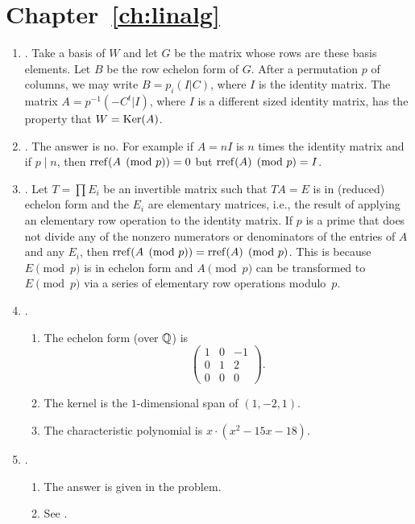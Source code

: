 \section{Chapter~\ref{ch:linalg}}
\begin{enumerate}
\item {}.
Take a basis of $W$ and let $G$ be the matrix
 whose rows are these basis elements. Let
 $B$ be the row echelon form of $G$. 
After a permutation $p$ of columns, we may
 write $B = p_i(I | C)$, where $I$ is the identity matrix.
 The matrix $A = p^{-1}(-C^t | I)$, where $I$ is a different
 sized identity matrix, has the property that
 $W = \operatorname{Ker}(A)$.

\item {}.
The answer is no.  For example if $A=nI$ is $n$ times the
identity matrix and if $p \mid n$, then $\operatorname{rref}(A\pmod{p})=0$
but $\operatorname{rref}(A)\pmod{p}=I$.

\item {}.
Let $T=\prod E_i$ be an invertible matrix such that $TA = E$ is
in (reduced) echelon form and the $E_i$ are elementary matrices,
i.e., the result of applying an elementary row operation to the
identity matrix.  If $p$ is a prime
that does not divide any of the nonzero numerators
or denominators of the entries of $A$ and any $E_i$, then 
$\operatorname{rref}(A \pmod{p}) = \operatorname{rref}(A) \pmod{p}$.  This is
because $E\pmod{p}$ is in echelon form and $A\pmod{p}$
can be transformed to $E\pmod{p}$ via a series of
elementary row operations modulo~$p$.

\item {}.
\begin{enumerate}
\item The echelon form (over $\mathbb{Q}$) is 
$$\left(\begin{array}{rrr}
1&0&-1\\
0&1&2\\
0&0&0
\end{array}\right).$$
\item The kernel is the $1$-dimensional span of 
$\left(1,-2,1\right)$.
\item The characteristic polynomial is $x \cdot (x^{2} - 15x - 18)$.
\end{enumerate}


\item {}.
\begin{enumerate}
\item The answer is given in the problem.
\item See \cite[\S2.4]{cohen:course_ant}. 
\end{enumerate}

\end{enumerate}

